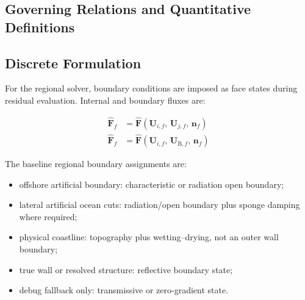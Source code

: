 \subsection{Governing Relations and Quantitative Definitions}
\label{sec:res-num-ibc-governing-relations}

%

\subsection{Discrete Formulation}
\label{sec:res-num-ibc-discrete-formulation}


For the regional solver, boundary conditions are imposed as face states
during residual evaluation. Internal and boundary fluxes are:

\begin{align}
  \widehat{\mathbf{F}}_f
  &=
  \widehat{\mathbf{F}}
  \left(
    \mathbf{U}_{i,f},\,
    \mathbf{U}_{j,f},\,
    \mathbf{n}_f
  \right)
  \label{eq:res-num-ibc-regional-internal-face-flux}
  \\
  \widehat{\mathbf{F}}_f
  &=
  \widehat{\mathbf{F}}
  \left(
    \mathbf{U}_{i,f},\,
    \mathbf{U}_{\mathrm{B},f},\,
    \mathbf{n}_f
  \right)
  \label{eq:res-num-ibc-regional-boundary-face-flux}
\end{align}

The baseline regional boundary assignments are:

\begin{itemize}
  \item offshore artificial boundary: characteristic or radiation open
    boundary;
  \item lateral artificial ocean cuts: radiation/open boundary plus
    sponge damping where required;
  \item physical coastline: topography plus wetting--drying, not an
    outer wall boundary;
  \item true wall or resolved structure: reflective boundary state;
  \item debug fallback only: transmissive or zero-gradient state.
\end{itemize}

